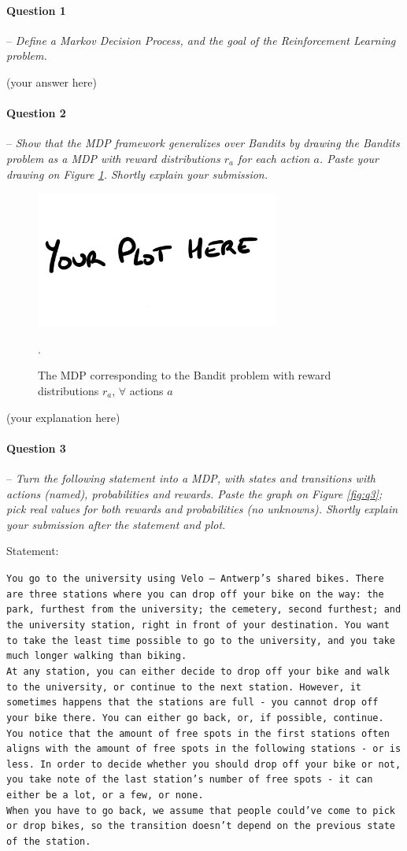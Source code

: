 \documentclass[a4paper]{article}
\newcommand{\question}[2]{
\paragraph{Question #1} -- \textit{#2}

}
\begin{document}
\question{1}{Define a Markov Decision Process, and the goal of the Reinforcement Learning problem.}
(your answer here)

\question{2}{Show that the MDP framework generalizes over Bandits by drawing the Bandits problem as a MDP with reward distributions $r_a$ for each action $a$. Paste your drawing on Figure \ref{fig:bandit_mdp}. Shortly explain your submission.}

\begin{figure}[H]
    \centering
    \includegraphics[width=8cm]{plots/your_plot_here.png}
    \caption{The MDP corresponding to the Bandit problem with reward distributions $r_a$, $\forall$ actions $a$}.
    \label{fig:bandit_mdp}
\end{figure}{}
(your explanation here)


\question{3}{Turn the following statement into a MDP, with states and transitions with actions (named), probabilities and rewards. Paste the graph on Figure \ref{fig:q3}; pick real values for both rewards and probabilities (no unknowns). Shortly explain your submission after the statement and plot.}

Statement:

\texttt{You go to the university using Velo -- Antwerp's shared bikes. There are three stations where you can drop off your bike on the way: the park, furthest from the university; the cemetery, second furthest; and the university station, right in front of your destination.
You want to take the least time possible to go to the university, and you take much longer walking than biking. \\
At any station, you can either decide to drop off your bike and walk to the university, or continue to the next station.
However, it sometimes happens that the stations are full - you cannot drop off your bike there. You can either go back, or, if possible, continue.\\
You notice that the amount of free spots in the first stations often aligns with the amount of free spots in the following stations - or is less. In order to decide whether you should drop off your bike or not, you take note of the last station's number of free spots - it can either be a lot, or a few, or none.\\
When you have to go back, we assume that people could've come to pick or drop bikes, so the transition doesn't depend on the previous state of the station.
}
\end{document}
